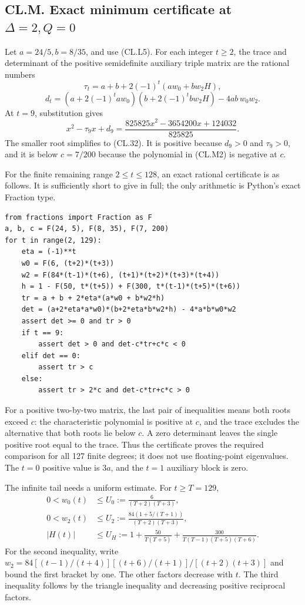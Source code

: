 \hypertarget{cl.m.-exact-minimum-certificate-at-delta2q0}{%
\subsection{\texorpdfstring{CL.M. Exact minimum certificate at \(\Delta=2,Q=0\)}{CL.M. Exact minimum certificate at \textbackslash Delta=2,Q=0}}\label{cl.m.-exact-minimum-certificate-at-delta2q0}}

Let \(a=24/5,b=8/35\), and use (CL.L5). For each integer \(t\geq2\), the trace and determinant of the positive semidefinite auxiliary triple matrix are the rational numbers \[
\tau_t=a+b+2(-1)^t(aw_0+bw_2H),
\] \[
d_t=(a+2(-1)^taw_0)(b+2(-1)^tbw_2H)-4ab\,w_0w_2.
\tag{CL.M1}
\] At \(t=9\), substitution gives \[
x^2-\tau_9x+d_9
=\frac{825825x^2-3654200x+124032}{825825}.
\tag{CL.M2}
\] The smaller root simplifies to (CL.32). It is positive because \(d_9>0\) and \(\tau_9>0\), and it is below \(c=7/200\) because the polynomial in (CL.M2) is negative at \(c\).

For the finite remaining range \(2\leq t\leq128\), an exact rational certificate is as follows. It is sufficiently short to give in full; the only arithmetic is Python's exact Fraction type.

\begin{verbatim}
from fractions import Fraction as F
a, b, c = F(24, 5), F(8, 35), F(7, 200)
for t in range(2, 129):
    eta = (-1)**t
    w0 = F(6, (t+2)*(t+3))
    w2 = F(84*(t-1)*(t+6), (t+1)*(t+2)*(t+3)*(t+4))
    h = 1 - F(50, t*(t+5)) + F(300, t*(t-1)*(t+5)*(t+6))
    tr = a + b + 2*eta*(a*w0 + b*w2*h)
    det = (a+2*eta*a*w0)*(b+2*eta*b*w2*h) - 4*a*b*w0*w2
    assert det >= 0 and tr > 0
    if t == 9:
        assert det > 0 and det-c*tr+c*c < 0
    elif det == 0:
        assert tr > c
    else:
        assert tr > 2*c and det-c*tr+c*c > 0
\end{verbatim}

For a positive two-by-two matrix, the last pair of inequalities means both roots exceed \(c\): the characteristic polynomial is positive at \(c\), and the trace excludes the alternative that both roots lie below \(c\). A zero determinant leaves the single positive root equal to the trace. Thus the certificate proves the required comparison for all 127 finite degrees; it does not use floating-point eigenvalues. The \(t=0\) positive value is \(3a\), and the \(t=1\) auxiliary block is zero.

The infinite tail needs a uniform estimate. For \(t\geq T=129\), \[
\begin{aligned}
0<w_0(t)&\leq U_0:=\frac6{(T+2)(T+3)},\\
0<w_2(t)&\leq U_2:=
\frac{84(1+5/(T+1))}{(T+2)(T+3)},\\
|H(t)|&\leq U_H:=
1+\frac{50}{T(T+5)}
+\frac{300}{T(T-1)(T+5)(T+6)}.
\end{aligned}
\tag{CL.M3}
\] For the second inequality, write \(w_2=84[(t-1)/(t+4)][(t+6)/(t+1)]/[(t+2)(t+3)]\) and bound the first bracket by one. The other factors decrease with \(t\). The third inequality follows by the triangle inequality and decreasing positive reciprocal factors.

